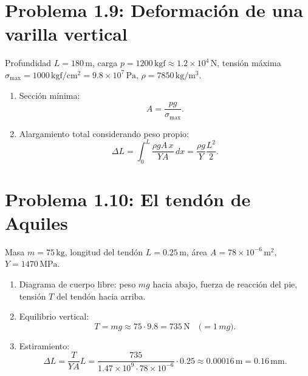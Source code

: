 \documentclass{article}
\begin{document}
\section*{Problema 1.9: Deformación de una varilla vertical}

Profundidad \(L=180\,\mathrm{m}\), carga \(p=1200\,\mathrm{kgf}\approx1.2\times10^4\,\mathrm{N}\), 
tensión máxima \(\sigma_\text{max}=1000\,\mathrm{kgf/cm^2}=9.8\times10^7\,\mathrm{Pa}\), 
\(\rho=7850\,\mathrm{kg/m^3}\).

\begin{enumerate}
  \item Sección mínima:
    \[
      A = \frac{p g}{\sigma_\text{max}}.
    \]
  \item Alargamiento total considerando peso propio:
    \[
      \Delta L = \int_0^L \frac{\rho g A\,x}{YA}\,dx 
      = \frac{\rho g}{Y} \frac{L^2}{2}.
    \]
\end{enumerate}

\section*{Problema 1.10: El tendón de Aquiles}

Masa \(m=75\,\mathrm{kg}\), longitud del tendón \(L=0.25\,\mathrm{m}\), 
área \(A=78\times10^{-6}\,\mathrm{m^2}\), \(Y=1470\,\mathrm{MPa}\).

\begin{enumerate}
  \item Diagrama de cuerpo libre: peso \(mg\) hacia abajo, fuerza de reacción del pie, 
    tensión \(T\) del tendón hacia arriba.
  \item Equilibrio vertical:
    \[
      T = mg \approx 75\cdot9.8 = 735\,\mathrm{N}
      \quad\text{(}=\!1\,mg\text{)}.
    \]
  \item Estiramiento:
    \[
      \Delta L = \frac{T}{YA} L
      = \frac{735}{1.47\times10^9 \cdot 78\times10^{-6}} \cdot 0.25
      \approx 0.00016\,\mathrm{m} = 0.16\,\mathrm{mm}.
    \]
\end{enumerate}
\end{document}
